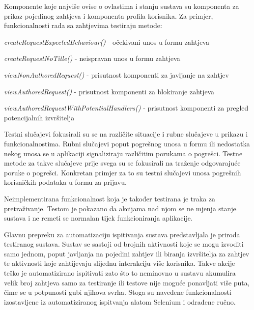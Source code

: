 			Komponente koje najviše ovise o ovlastima i stanju sustava su komponenta za prikaz pojedinog zahtjeva i komponenta profila korisnika.
			Za primjer, funkcionalnosti rada sa zahtjevima testiraju metode:
			\begin{packed_enum}
				
				\item \textit{createRequestExpectedBehaviour()} - očekivani unos u formu zahtjeva
				\item \textit{createRequestNoTitle()} - neispravan unos u formu zahtjeva
				\item \textit{viewNonAuthoredRequest()} - prisutnost komponenti za javljanje na zahtjev
				\item \textit{viewAuthoredRequest()} - prisutnost komponenti za blokiranje zahtjeva
				\item \textit{viewAuthoredRequestWithPotentialHandlers()} - prisutnost komponenti za pregled potencijalnih izvršitelja 
			\end{packed_enum}
			
		
			
			Testni slučajevi fokusirali su se na različite situacije i rubne slučajeve u prikazu i funkcionalnostima.
			Rubni slučajevi poput pogrešnog unosa u formu ili nedostatka nekog unosa se u aplikaciji signaliziraju različitim porukama o pogrešci. 
			Testne metode za takve slučajeve prije svega su se fokusirali na traženje odgovarajuće poruke o pogrešci.
			Konkretan primjer za to su testni slučajevi unosa pogrešnih korisničkih podataka u formu za prijavu. \newline 
			
			Neimplementirana funkcionalnost koja je također testirana je traka za pretraživanje. 
			Testom je pokazano da akcijama nad njom se ne mjenja stanje sustava i ne remeti se normalan tijek funkcioniranja aplikacije. \newline
			
			Glavnu prepreku za automatizaciju ispitivanja sustava predstavljala je priroda testiranog sustava. 
			Sustav se sastoji od brojnih aktivnosti koje se mogu izvoditi samo jednom, poput javljanja na pojedini zahtjev ili 
			biranja izvršitelja za zahtjev te aktivnosti koje zahtijevaju slijednu interakciju više korisnika.
			Takve akcije teško je automatizirano ispitivati zato što to neminovno u sustavu akumulira velik broj zahtjeva samo za testiranje 
			ili testove nije moguće ponavljati više puta, čime se u potpunosti gubi njihova svrha.
			Stoga su navedene funkcionalnosti izostavljene iz automatiziranog ispitvanja alatom Selenium i odrađene ručno.
			
